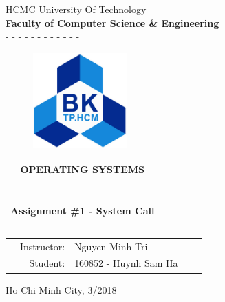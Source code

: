 \begin{titlepage}
\vspace{1.5cm}
\begin{center} \large
HCMC University Of Technology \\
\textbf{Faculty of Computer Science \& Engineering} \\
- - - - - - - - - - - -
\end{center}


\vspace{1cm}
\begin{figure}[h!]
\begin{center}
\includegraphics[width=3.6cm]{Images/LogoBK}
\end{center}
\end{figure}
\vspace{1cm}



\begin{center}
\begin{tabular}{c}
\multicolumn{1}{c}{\textbf{{\huge OPERATING SYSTEMS}}}\\
~~\\
\hline
\\ \\
\textbf{{\Huge Assignment \#1 - System Call}} \\
\\ \\
\hline
\end{tabular}
\end{center}

\begin{table}[h]
\begin{tabular}{rrlrr}
\hspace{7cm} 
& Instructor: & Nguyen Minh Tri & & \\ 
& Student: & 160852 - Huynh Sam Ha \\
\end{tabular}
\end{table}

\vspace{3cm}

\begin{center}
{\footnotesize Ho Chi Minh City, 3/2018}
\end{center}

\end{titlepage}
